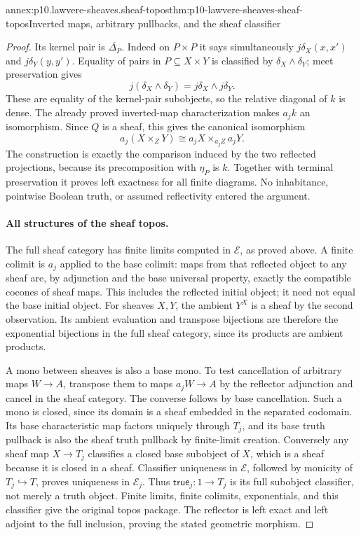 \begin{annexitem}{annex:p10.lawvere-sheaves.sheaf-topos}{thm:p10-lawvere-sheaves-sheaf-topos}{Inverted maps, arbitrary pullbacks, and the sheaf classifier}
\begin{proof}
Its kernel pair is \(\overline{\Delta_P}\).
Indeed on \(P\times P\) it says simultaneously
\(j\delta_X(x,x')\) and \(j\delta_Y(y,y')\).
Equality of pairs in \(P\subseteq X\times Y\)
is classified by \(\delta_X\land\delta_Y\);
meet preservation gives
\[
                j(\delta_X\land\delta_Y)
                           =j\delta_X\land j\delta_Y.
\]
These are equality of the kernel-pair subobjects,
so the relative diagonal of \(k\) is dense.
The already proved inverted-map characterization
makes \(a_jk\) an isomorphism.  Since \(Q\)
is a sheaf, this gives the canonical isomorphism
\[
                    a_j(X\times_ZY)
                              \cong a_jX\times_{a_jZ}a_jY.
\]
The construction is exactly the comparison induced
by the two reflected projections, because its
precomposition with \(\eta_P\) is \(k\).
Together with terminal preservation it proves
left exactness for all finite diagrams.  No
inhabitance, pointwise Boolean truth, or assumed
reflectivity entered the argument.

\paragraph{All structures of the sheaf topos.}
The full sheaf category has finite limits computed
in \(\mathcal E\), as proved above.  A finite
colimit is \(a_j\) applied to the base colimit:
maps from that reflected object to any sheaf are,
by adjunction and the base universal property,
exactly the compatible cocones of sheaf maps.
This includes the reflected initial object; it
need not equal the base initial object.
For sheaves \(X,Y\), the ambient \(Y^X\) is
a sheaf by the second observation.  Its ambient
evaluation and transpose bijections are therefore
the exponential bijections in the full sheaf
category, since its products are ambient products.

A mono between sheaves is also a base mono.  To
test cancellation of arbitrary maps \(W\to A\),
transpose them to maps \(a_jW\to A\) by the
reflector adjunction and cancel in the sheaf
category.  The converse follows by base
cancellation.  Such a mono is closed, since
its domain is a sheaf embedded in the separated
codomain.  Its base characteristic map factors
uniquely through \(T_j\), and its base truth
pullback is also the sheaf truth pullback by
finite-limit creation.  Conversely any sheaf
map \(X\to T_j\) classifies a closed base
subobject of \(X\), which is a sheaf because
it is closed in a sheaf.  Classifier uniqueness
in \(\mathcal E\), followed by monicity of
\(T_j\hookrightarrow T\), proves uniqueness
in \(\mathcal E_j\).  Thus
\(\mathsf{true}_j:1\to T_j\) is its full
subobject classifier, not merely a truth object.
Finite limits, finite colimits, exponentials,
and this classifier give the original topos
package.  The reflector is left exact and
left adjoint to the full inclusion, proving
the stated geometric morphism.


\end{proof}
\end{annexitem}

